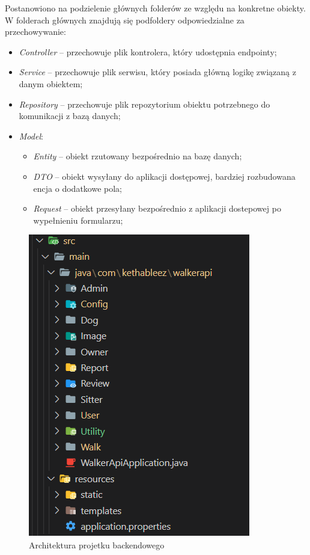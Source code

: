 Postanowiono na podzielenie głównych folderów ze względu na konkretne obiekty.
W folderach głównych znajdują się podfoldery odpowiedzialne za przechowywanie: 
\begin{itemize}[leftmargin=1cm]
  \item \textit{Controller} -- przechowuje plik kontrolera, który udostępnia endpointy;
  \item \textit{Service} -- przechowuje plik serwisu, który posiada główną logikę związaną z danym obiektem;
  \item \textit{Repository} -- przechowuje plik repozytorium obiektu potrzebnego do komunikacji z bazą danych;
  \item \textit{Model}:
  \begin{itemize}
    \item \textit{Entity} -- obiekt rzutowany bezpośrednio na bazę danych;
    \item \textit{DTO} -- obiekt wysyłany do aplikacji dostępowej, bardziej rozbudowana encja o dodatkowe pola;
    \item \textit{Request} -- obiekt przesyłany bezpośrednio z aplikacji dostepowej po wypełnieniu formularzu;
  \end{itemize}
\end{itemize}

\begin{figure}[H]
  \centering
  \includegraphics[width=0.5\linewidth]{rysunki/arch-java.PNG}
  \caption{Architektura projetku backendowego}
  \label{fig:java-architecture}
\end{figure}

